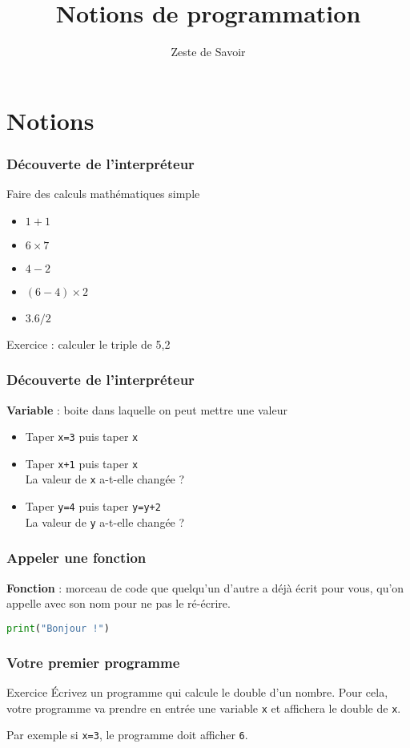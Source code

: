 \documentclass{beamer}
\title{Notions de programmation}
\author{Zeste de Savoir}
\begin{document}
\begin{frame}
  \titlepage
\end{frame}

\section{Notions}

\begin{frame}
    \frametitle{Découverte de l'interpréteur}
    Faire des calculs mathématiques simple
    \begin{itemize}
    \item \(1+1\)
    \item \(6\times 7\)
    \item \(4-2\)
    \item \((6-4)\times 2\)
    \item \(3.6 / 2\)
    \end{itemize}

    Exercice : calculer le triple de 5,2
\end{frame}

\begin{frame}
    \frametitle{Découverte de l'interpréteur}
    \textbf{Variable} : boite dans laquelle on peut mettre une valeur
    \begin{itemize}
        \item Taper \texttt{x=3} puis taper \texttt{x}
        \item Taper \texttt{x+1} puis taper \texttt{x}
        \\ La valeur de \texttt{x} a-t-elle changée ?
        \item Taper \texttt{y=4} puis taper \texttt{y=y+2}
        \\ La valeur de \texttt{y} a-t-elle changée ?
    \end{itemize}
\end{frame}

\begin{frame}[fragile]
    \frametitle{Appeler une fonction}
    \textbf{Fonction} : morceau de code que quelqu'un d'autre a déjà écrit pour vous, qu'on appelle avec son nom pour ne pas le ré-écrire.
    \medbreak
    \begin{lstlisting}[language=python]
    print("Bonjour !")
    \end{lstlisting}
\end{frame}

\begin{frame}
  \frametitle{Votre premier programme}
  \begin{block}{Exercice}
    Écrivez un programme qui calcule le double d'un nombre. Pour cela, votre programme va prendre en entrée une variable \texttt{x} et affichera le double de \texttt{x}.
  \end{block}
  Par exemple si \texttt{x=3}, le programme doit afficher \texttt{6}.
\end{frame}
\end{document}

